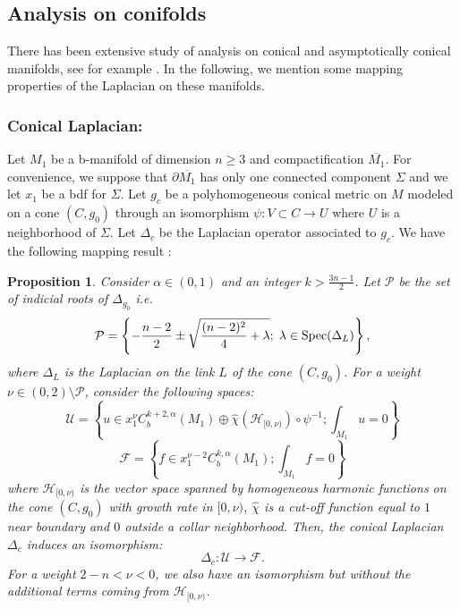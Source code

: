 \documentclass[a4paper,11pt]{article}
\newcounter{mythm}[section]
\newtheorem{pr}[mythm]{Proposition}
\begin{document}
\subsection{Analysis on conifolds} \label{anacon}
There has been extensive study of analysis on conical and asymptotically conical manifolds, see for example \cite{cheeger_spectral_1983, joyce_special_2004, pacini_desingularizing_2013, lockhart_elliptic_1985, marshall_deformations_nodate, hein_calabi-yau_2017, Rafe_elliptic}. In the following, we mention some mapping properties of the Laplacian on these manifolds.
\subsubsection*{Conical Laplacian:}
Let $M_1$ be a b-manifold of dimension $n \geq 3$ and compactification $\overline{M_1}$. For convenience, we suppose that $ \partial \overline{M_1}$ has only one connected component $\Sigma$ and we let $x_1$ be a bdf for $\Sigma$. Let $g_c$ be a polyhomogeneous conical metric on $M$ modeled on a cone $(C, g_0)$ through an isomorphism $\psi : V \subset C \rightarrow U$ where $U$ is a neighborhood of $\Sigma$. Let $\Delta_c$ be the Laplacian operator associated to $g_c$. We have the following mapping result \cite{hein_calabi-yau_2017}: 
\begin{pr} \label{conlap} Consider $\alpha \in (0,1)$ and an integer $k > \frac{3n -1 }{2}$. Let $\mathcal{P}$ be the set of indicial roots of $\Delta_{g_0}$ i.e.
$$
\mathcal{P} = \left\{ - \frac{n-2}{2} \pm \sqrt{\frac{(n-2)^2}{4} + \lambda }; \hspace{0.1cm} \lambda \in \mathrm{Spec}(\Delta_L) \right\},
$$
where $\Delta_L$ is the Laplacian on the link $L$ of the cone $(C, g_0)$. 
For a weight $\nu \in (0, 2 ) \setminus \mathcal{P}$, consider the following spaces:  
$$
\mathcal{U}=\left\{u \in x_1^{\nu} C_{b}^{k+2, \alpha}\left(M_1\right) \oplus \hat{\chi}\left( \mathcal{H}_{[0, \nu)}\right) \circ \psi^{-1}; \int_{M_1} u =0\right\} 
$$ $$\mathcal{F}=\left\{f \in x_1^{\nu-2}C_{b}^{k, \alpha}\left(M_1\right) ; \int_{M_1} f =0\right\} 
$$
where $ \mathcal{H}_{[0, \nu)}$ is the vector space spanned by homogeneous harmonic functions on the cone $(C, g_0)$ with growth rate in $[0, \nu) $, $\hat{\chi}$ is a cut-off function equal to $1$ near boundary and $0$ outside a collar neighborhood. 
Then, the conical Laplacian $\Delta_c$ induces an isomorphism: 
$$
\Delta_{c} : \mathcal{U} \rightarrow \mathcal{F}.
$$ 
For a weight $2-n < \nu < 0 $, we also have an isomorphism but without the additional terms coming from $ \mathcal{H}_{[0, \nu)}$.  
\end{pr}
\end{document}
